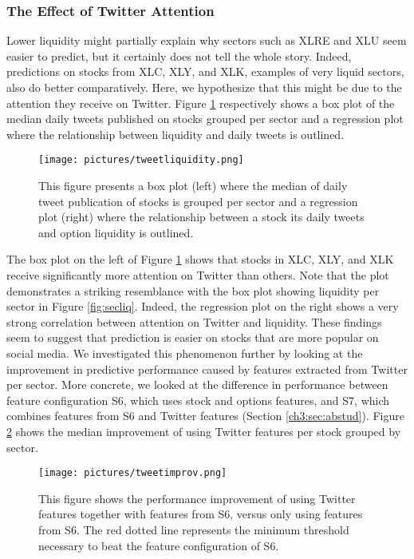 \documentclass[preprint,1p, times,authoryear]{elsarticle}
\begin{document}
\subsubsection{The Effect of Twitter Attention}
Lower liquidity might partially explain why sectors such as XLRE and XLU seem easier to predict, but it certainly does not tell the whole story. Indeed, predictions on stocks from XLC, XLY, and XLK, examples of very liquid sectors, also do better comparatively. Here, we hypothesize that this might be due to the attention they receive on Twitter. Figure \ref{fig:tweetliq} respectively shows a box plot of the median daily tweets published on stocks grouped per sector and a regression plot where the relationship between liquidity and daily tweets is outlined. 

\begin{figure}[ht!]
\centering
\texttt{[image: pictures/tweetliquidity.png]}
\caption{This figure presents a box plot (left) where the median of daily tweet publication of stocks is grouped per sector and a regression plot (right) where the relationship between a stock its daily tweets and option liquidity is outlined.}
\label{fig:tweetliq}
\end{figure}


The box plot on the left of Figure \ref{fig:tweetliq} shows that stocks in XLC, XLY, and XLK receive significantly more attention on Twitter than others. Note that the plot demonstrates a striking resemblance with the box plot showing liquidity per sector in Figure \ref{fig:secliq}. Indeed, the regression plot on the right shows a very strong correlation between attention on Twitter and liquidity. These findings seem to suggest that prediction is easier on stocks that are more popular on social media. We investigated this phenomenon further by looking at the improvement in predictive performance caused by features extracted from Twitter per sector. More concrete, we looked at the difference in performance between feature configuration S6, which uses stock and options features, and S7, which combines features from S6 and Twitter features (Section \ref{ch3:sec:abstud}). Figure \ref{fig:tweetimprov} shows the median improvement of using Twitter features per stock grouped by sector.  

\begin{figure}[ht!]
\centering
\texttt{[image: pictures/tweetimprov.png]}
\caption{This figure shows the performance improvement of using Twitter features together with features from S6, versus only using features from S6. The red dotted line represents the minimum threshold necessary to beat the feature configuration of S6.}
\label{fig:tweetimprov}
\end{figure}
\end{document}
